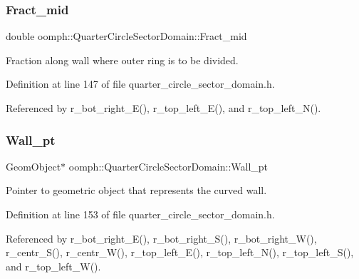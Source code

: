 \mbox{\label{classoomph_1_1QuarterCircleSectorDomain_ade78897c44c26af82ac90052f799796c}} 
\subsubsection{\texorpdfstring{Fract\+\_\+mid}{Fract\_mid}}
{\footnotesize\ttfamily double oomph\+::\+Quarter\+Circle\+Sector\+Domain\+::\+Fract\+\_\+mid\hspace{0.3cm}{\ttfamily [private]}}



Fraction along wall where outer ring is to be divided. 



Definition at line 147 of file quarter\+\_\+circle\+\_\+sector\+\_\+domain.\+h.



Referenced by r\+\_\+bot\+\_\+right\+\_\+\+E(), r\+\_\+top\+\_\+left\+\_\+\+E(), and r\+\_\+top\+\_\+left\+\_\+\+N().

\mbox{\label{classoomph_1_1QuarterCircleSectorDomain_a59722c43d41fef0bc3df4cf6571930a8}} 
\subsubsection{\texorpdfstring{Wall\+\_\+pt}{Wall\_pt}}
{\footnotesize\ttfamily Geom\+Object$\ast$ oomph\+::\+Quarter\+Circle\+Sector\+Domain\+::\+Wall\+\_\+pt\hspace{0.3cm}{\ttfamily [private]}}



Pointer to geometric object that represents the curved wall. 



Definition at line 153 of file quarter\+\_\+circle\+\_\+sector\+\_\+domain.\+h.



Referenced by r\+\_\+bot\+\_\+right\+\_\+\+E(), r\+\_\+bot\+\_\+right\+\_\+\+S(), r\+\_\+bot\+\_\+right\+\_\+\+W(), r\+\_\+centr\+\_\+\+S(), r\+\_\+centr\+\_\+\+W(), r\+\_\+top\+\_\+left\+\_\+\+E(), r\+\_\+top\+\_\+left\+\_\+\+N(), r\+\_\+top\+\_\+left\+\_\+\+S(), and r\+\_\+top\+\_\+left\+\_\+\+W().

